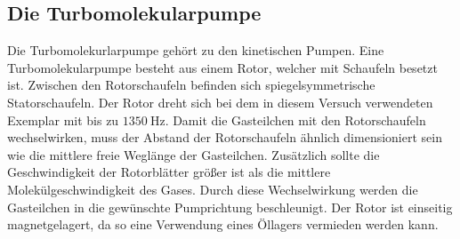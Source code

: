\subsection{Die Turbomolekularpumpe}
Die Turbomolekurlarpumpe gehört zu den kinetischen Pumpen. Eine Turbomolekularpumpe besteht
aus einem Rotor, welcher mit Schaufeln besetzt ist. Zwischen den Rotorschaufeln befinden sich
spiegelsymmetrische Statorschaufeln. Der Rotor dreht sich bei dem in diesem Versuch verwendeten
Exemplar mit bis zu $\SI{1350}{\hertz}$. Damit die Gasteilchen mit den Rotorschaufeln wechselwirken,
muss der Abstand der Rotorschaufeln ähnlich dimensioniert sein wie die mittlere freie Weglänge der
Gasteilchen. Zusätzlich sollte die Geschwindigkeit der Rotorblätter größer ist als die mittlere
Molekülgeschwindigkeit des Gases. Durch diese Wechselwirkung werden die Gasteilchen in die
gewünschte Pumprichtung beschleunigt. Der Rotor ist einseitig magnetgelagert, da
so eine Verwendung eines Öllagers vermieden werden kann.
